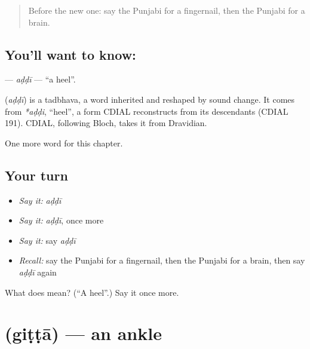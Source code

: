 \label{lesson:PA-C136-addi}



\begin{quote}
Before the new one: say the Punjabi for a fingernail, then the Punjabi for a brain.
\end{quote}

\subsection*{You'll want to know: }
\textbf{} — \emph{aḍḍī} — \textquotedblleft{}a heel\textquotedblright{}.

\begin{cousinweb}
\textbf{} (\emph{aḍḍī}) is a tadbhava, a word inherited and reshaped by sound change. It comes from \emph{*aḍḍi}, \textquotedblleft{}heel\textquotedblright{}, a form CDIAL reconstructs from its descendants (CDIAL 191). CDIAL, following Bloch, takes it from Dravidian.
\end{cousinweb}

\begin{grammarlens}[title={What you've built}]
One more word for this chapter.
\end{grammarlens}

\subsection*{Your turn}
\begin{itemize}
\raggedright
  \item \emph{Say it:} \emph{aḍḍī}
  \item \emph{Say it:} \emph{aḍḍī}, once more
  \item \emph{Say it:} say \emph{aḍḍī}
  \item \emph{Recall:} say the Punjabi for a fingernail, then the Punjabi for a brain, then say \emph{aḍḍī} again
\end{itemize}

\begin{tcolorbox}[breakable,colback=teal!4,colframe=teal!35!black,title={Before you move on}]
What does  mean? (\textquotedblleft{}A heel\textquotedblright{}.) Say it once more.
\end{tcolorbox}
\section[\texorpdfstring{\pa{ਗਿੱਟਾ} (giṭṭā)}{ਗਿੱਟਾ (giṭṭā)}]{ (giṭṭā) — an ankle}

